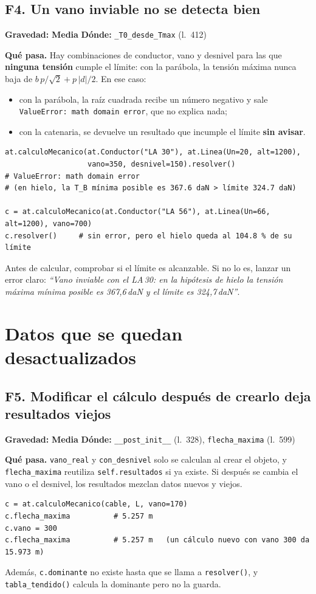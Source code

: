 \documentclass[11pt,a4paper]{article}
\newcommand{\media}{\textcolor{media}{\textbf{Media}}}
\newcommand{\code}[1]{\texttt{#1}}
\newcommand{\fallo}[4]{%
  \subsection[#1. #2]{#1. #2}
  \noindent\textbf{Gravedad:} #3 \quad \textbf{Dónde:} #4\par\medskip}
\begin{document}
\fallo{F4}{Un vano inviable no se detecta bien}{\media}{\code{\_T0\_desde\_Tmax} (l.~412)}

\textbf{Qué pasa.} Hay combinaciones de conductor, vano y desnivel para las que \textbf{ninguna tensión} cumple el límite: con la parábola, la tensión máxima nunca baja de $b\,p/\sqrt2 + p\,|d|/2$. En ese caso:
\begin{itemize}[leftmargin=1.5em]
  \item con la parábola, la raíz cuadrada recibe un número negativo y sale \code{ValueError: math domain error}, que no explica nada;
  \item con la catenaria, se devuelve un resultado que incumple el límite \textbf{sin avisar}.
\end{itemize}
\begin{lstlisting}
at.calculoMecanico(at.Conductor("LA 30"), at.Linea(Un=20, alt=1200),
                   vano=350, desnivel=150).resolver()
# ValueError: math domain error
# (en hielo, la T_B mínima posible es 367.6 daN > límite 324.7 daN)

c = at.calculoMecanico(at.Conductor("LA 56"), at.Linea(Un=66, alt=1200), vano=700)
c.resolver()     # sin error, pero el hielo queda al 104.8 % de su límite
\end{lstlisting}

\begin{arreglo}
Antes de calcular, comprobar si el límite es alcanzable. Si no lo es, lanzar un error claro: \emph{``Vano inviable con el LA\,30: en la hipótesis de hielo la tensión máxima mínima posible es 367,6\,daN y el límite es 324,7\,daN''}.
\end{arreglo}

\section{Datos que se quedan desactualizados}

\fallo{F5}{Modificar el cálculo después de crearlo deja resultados viejos}{\media}{\code{\_\_post\_init\_\_} (l.~328), \code{flecha\_maxima} (l.~599)}

\textbf{Qué pasa.} \code{vano\_real} y \code{con\_desnivel} solo se calculan al crear el objeto, y \code{flecha\_maxima} reutiliza \code{self.resultados} si ya existe. Si después se cambia el vano o el desnivel, los resultados mezclan datos nuevos y viejos.
\begin{lstlisting}
c = at.calculoMecanico(cable, L, vano=170)
c.flecha_maxima          # 5.257 m
c.vano = 300
c.flecha_maxima          # 5.257 m   (un cálculo nuevo con vano 300 da 15.973 m)
\end{lstlisting}
Además, \code{c.dominante} no existe hasta que se llama a \code{resolver()}, y \code{tabla\_tendido()} calcula la dominante pero no la guarda.
\end{document}
